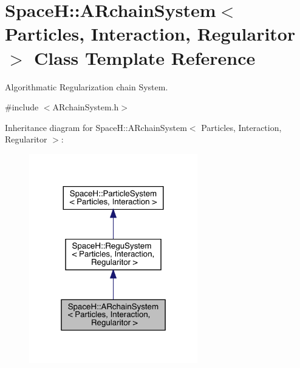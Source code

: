 \hypertarget{class_space_h_1_1_a_rchain_system}{}\section{SpaceH\+:\+:A\+Rchain\+System$<$ Particles, Interaction, Regularitor $>$ Class Template Reference}
\label{class_space_h_1_1_a_rchain_system}


Algorithmatic Regularization chain System.  




{\ttfamily \#include $<$A\+Rchain\+System.\+h$>$}



Inheritance diagram for SpaceH\+:\+:A\+Rchain\+System$<$ Particles, Interaction, Regularitor $>$\+:
\nopagebreak
\begin{figure}[H]
\begin{center}
\leavevmode
\includegraphics[width=208pt]{class_space_h_1_1_a_rchain_system__inherit__graph}
\end{center}
\end{figure}



